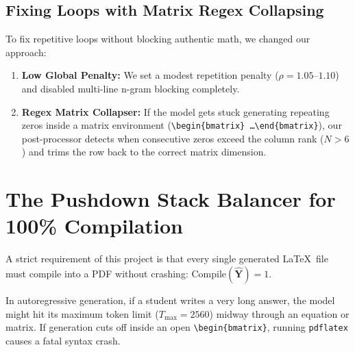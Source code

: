 \subsection{Fixing Loops with Matrix Regex Collapsing}
To fix repetitive loops without blocking authentic math, we changed our approach:
\begin{enumerate}
    \item \textbf{Low Global Penalty:} We set a modest repetition penalty ($\rho = 1.05$--$1.10$) and disabled multi-line n-gram blocking completely.
    \item \textbf{Regex Matrix Collapser:} If the model gets stuck generating repeating zeros inside a matrix environment (\texttt{\textbackslash begin\{bmatrix\} \dots \textbackslash end\{bmatrix\}}), our post-processor detects when consecutive zeros exceed the column rank ($N > 6$) and trims the row back to the correct matrix dimension.
\end{enumerate}

\section{The Pushdown Stack Balancer for 100\% Compilation}
\label{sec:environment_balancer}

A strict requirement of this project is that every single generated \LaTeX\ file must compile into a PDF without crashing: $\text{Compile}(\hat{\mathbf{Y}}) = 1$.

In autoregressive generation, if a student writes a very long answer, the model might hit its maximum token limit ($T_{\text{max}} = 2560$) midway through an equation or matrix. If generation cuts off inside an open \texttt{\textbackslash begin\{bmatrix\}}, running \texttt{pdflatex} causes a fatal syntax crash.

